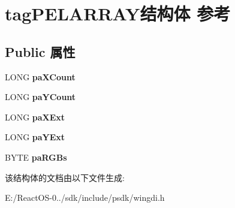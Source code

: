\hypertarget{structtag_p_e_l_a_r_r_a_y}{}\section{tag\+P\+E\+L\+A\+R\+R\+A\+Y结构体 参考}
\label{structtag_p_e_l_a_r_r_a_y}
\subsection*{Public 属性}
\begin{DoxyCompactItemize}
\item 
\mbox{\label{structtag_p_e_l_a_r_r_a_y_af075d15a6f0c74f36423376a2816e660}} 
L\+O\+NG {\bfseries pa\+X\+Count}
\item 
\mbox{\label{structtag_p_e_l_a_r_r_a_y_af2d47b1ec5deb046fcf3ac071c94da26}} 
L\+O\+NG {\bfseries pa\+Y\+Count}
\item 
\mbox{\label{structtag_p_e_l_a_r_r_a_y_a58f39c5157c6d42d6752eb0e563e7c0f}} 
L\+O\+NG {\bfseries pa\+X\+Ext}
\item 
\mbox{\label{structtag_p_e_l_a_r_r_a_y_a3ad66992fdd513b6329ca1cdabac35e6}} 
L\+O\+NG {\bfseries pa\+Y\+Ext}
\item 
\mbox{\label{structtag_p_e_l_a_r_r_a_y_ad4a75ed9a48d2d5fb783b16f0ac9365b}} 
B\+Y\+TE {\bfseries pa\+R\+G\+Bs}
\end{DoxyCompactItemize}


该结构体的文档由以下文件生成\+:\begin{DoxyCompactItemize}
\item 
E\+:/\+React\+O\+S-\/0../sdk/include/psdk/wingdi.\+h\end{DoxyCompactItemize}
